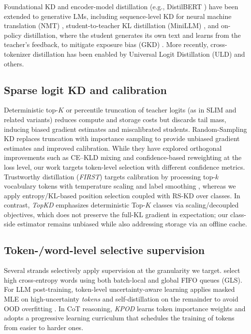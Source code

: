 \documentclass[11pt]{article}
\begin{document}
Foundational KD \citep{hinton2015distillation} and encoder-model distillation (e.g., DistilBERT \citep{sanh2019distilbert}) have been extended to generative LMs, including sequence-level KD for neural machine translation (NMT) \citep{kim2016sequencekd}, student-to-teacher KL distillation (MiniLLM) \citep{gu2023minillm}, and on-policy distillation, where the student generates its own text and learns from the teacher's feedback, to mitigate exposure bias (GKD) \citep{agarwal2024gkd}.
More recently, cross-tokenizer distillation has been enabled by Universal Logit Distillation (ULD) \citep{boizard2024uld} and others.

\subsection{Sparse logit KD and calibration}
Deterministic top-$K$ or percentile truncation of teacher logits (as in SLIM \citep{raman2023slim} and related variants) reduces compute and storage costs but discards tail mass, inducing biased gradient estimates and miscalibrated students.
Random-Sampling KD \citep{anshumann2025sparse} replaces truncation with importance sampling to provide unbiased gradient estimates and improved calibration.
While they have explored orthogonal improvements such as CE--KLD mixing and confidence-based reweighting at the loss level, our work targets token-level selection with different confidence metrics.
Trustworthy distillation (\emph{FIRST}) targets calibration by processing top-$k$ vocabulary tokens with temperature scaling and label smoothing \citep{shum2024first}, whereas we apply entropy/KL-based position selection coupled with RS-KD over classes.
In contrast, \emph{TopKD} \citep{wang2025topkd} emphasizes deterministic Top-$K$ classes via scaling/decoupled objectives, which does not preserve the full-KL gradient in expectation; our class-side estimator remains unbiased while also addressing storage via an offline cache.

\subsection{Token-/word-level selective supervision}
Several strands selectively apply supervision at the granularity we target.
\citet{wang2021selectivekd} select high cross-entropy words using both batch-local and global FIFO queues (GLS). For LLM post-training, token-level uncertainty-aware learning applies masked MLE on high-uncertainty \emph{tokens} and self-distillation on the remainder to avoid OOD overfitting \citep{liu2025tokenlevel}.
In CoT reasoning, \emph{KPOD} \citep{feng2024kpod} learns token importance weights and adopts a progressive learning curriculum that schedules the training of tokens from easier to harder ones.
\end{document}
